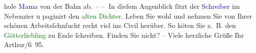                hole \textcolor{blue}{Mama}{} von der Bahn
               ab. –\pend
           \pstart
           – In dieſem Augenblick {\pb}ſitzt der \textcolor{blue}{Schreiber}{} im Nebenzi{\geminationm}er u paginirt den \textcolor{green}{alten
                  Dichter}{}\ledrightnote{\textcolor{green}{Später Ruhm}}.\pend
           \pstart
           Leben Sie wohl und nehmen Sie von Ihrer schönen Arbeitsſehnſucht recht viel ins Civil
               herüber. So kö{\geminationn}ten Sie z. B. den \textcolor{green}{Götterliebling}{}\ledrightnote{\textcolor{green}{Der Tod Georgs}} zu Ende ſchreiben. Finden Sie nicht? – Viele {\pb}herzliche Grüße\pend
           \pstart Ihr \spacefill\mbox{Arthur}\pend{}/6 95.\pend
           \endnumbering{}  
      